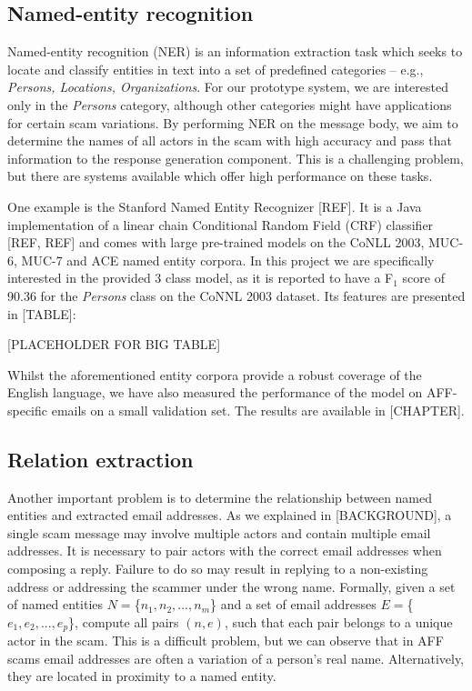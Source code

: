 \subsection{Named-entity recognition}
Named-entity recognition (NER) is an information extraction task which seeks to locate and classify entities in text into a set of predefined categories -- e.g., \textit{Persons, Locations, Organizations}. For our prototype system, we are interested only in the \emph{Persons} category, although other categories might have applications for certain scam variations.  By performing NER on the message body, we aim to determine the names of all actors in the scam with high accuracy and pass that information to the response generation component. This is a challenging problem, but there are systems available which offer high performance on these tasks.

One example is the Stanford Named Entity Recognizer [REF]. It is a Java implementation of a linear chain Conditional Random Field (CRF) classifier [REF, REF] and comes with large pre-trained models on the CoNLL 2003, MUC-6, MUC-7 and ACE named entity corpora. In this project we are specifically interested in the provided 3 class model, as it is reported to have a F$_{1}$ score of 90.36 for the \emph{Persons} class on the CoNNL 2003 dataset. Its features are presented in [TABLE]:

[PLACEHOLDER FOR BIG TABLE]

Whilst the aforementioned entity corpora provide a robust coverage of the English language, we have also measured the performance of the model on AFF-specific emails on a small validation set. The results are available in [CHAPTER]. 

\subsection{Relation extraction}
Another important problem is to determine the relationship between named entities and extracted email addresses. As we explained in [BACKGROUND], a single scam message may involve multiple actors and contain multiple email addresses. It is necessary to pair actors with the correct email addresses when composing a reply. Failure to do so may result in replying to a non-existing address or addressing the scammer under the wrong name. Formally, given a set of named entities $N = $\{$n_{1}, n_{2},...,n_{m}$\} and a set of email addresses $E = $\{$e_{1}, e_{2},...,e_{p}$\}, compute all pairs $(n, e)$, such that each pair belongs to a unique actor in the scam. This is a difficult problem, but we can observe that in AFF scams email addresses are often a variation of a person's real name. Alternatively, they are located in proximity to a named entity.

